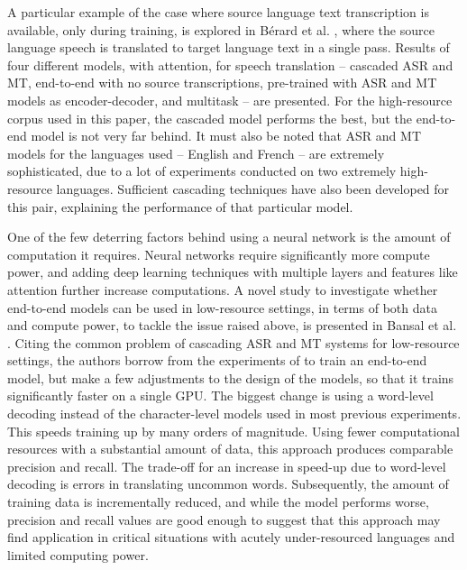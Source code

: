 \documentclass{article}
\begin{document}
A particular example of the case where source language text transcription is available, only during training, is explored in Bérard et al. \cite{Berard:18}, where the source language speech is translated to target language text in a single pass. Results of four different models, with attention, for speech translation – cascaded ASR and MT, end-to-end with no source transcriptions, pre-trained with ASR and MT models as encoder-decoder, and multitask – are presented. For the high-resource corpus used in this paper, the cascaded model performs the best, but the end-to-end model is not very far behind. It must also be noted that ASR and MT models for the languages used – English and French – are extremely sophisticated, due to a lot of experiments conducted on two extremely high-resource languages. Sufficient cascading techniques have also been developed for this pair, explaining the performance of that particular model. \medskip

One of the few deterring factors behind using a neural network is the amount of computation it requires. Neural networks require significantly more compute power, and adding deep learning techniques with multiple layers and features like attention further increase computations. A novel study to investigate whether end-to-end models can be used in low-resource settings, in terms of both data and compute power, to tackle the issue raised above, is presented in Bansal et al. \cite{Bansal:18}. Citing the common problem of cascading ASR and MT systems for low-resource settings, the authors borrow from the experiments of \cite{Weiss:17} to train an end-to-end model, but make a few adjustments to the design of the models, so that it trains significantly faster on a single GPU. The biggest change is using a word-level decoding instead of the character-level models used in most previous experiments. This speeds training up by many orders of magnitude. Using fewer computational resources with a substantial amount of data, this approach produces comparable precision and recall. The trade-off for an increase in speed-up due to word-level decoding is errors in translating uncommon words. Subsequently, the amount of training data is incrementally reduced, and while the model performs worse, precision and recall values are good enough to suggest that this approach may find application in critical situations with acutely under-resourced languages and limited computing power. \medskip
\end{document}
